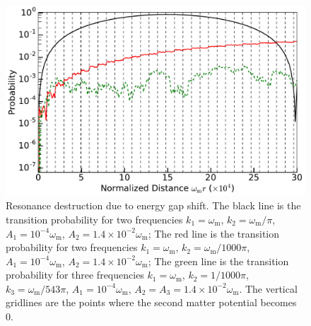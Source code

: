 \documentclass[%
reprint,
 amsmath,amssymb,
 aps,
]{revtex4-1}
\begin{document}
\begin{figure}[!htbp]
    \centering
    \includegraphics[width=\columnwidth]{assets/interference-reduction-three-modes}
    \caption{Resonance destruction due to energy gap shift. The black line is the transition probability for two frequencies $k_1=\omega_{\mathrm m}$, $k_2=\omega_{\mathrm m}/\pi$, $A_1=10^{-4}\omega_{\mathrm m}$, $A_2 = 1.4\times 10^{-2}\omega_{\mathrm m}$; The red line is the transition probability for two frequencies $k_1=\omega_{\mathrm m}$, $k_2=\omega_{\mathrm m}/1000 \pi$, $A_1=10^{-4}\omega_{\mathrm m}$, $A_2 = 1.4\times 10^{-2}\omega_{\mathrm m}$; The green line is the transition probability for three frequencies $k_1=\omega_{\mathrm m}$, $k_2=1/1000\pi$, $k_3=\omega_{\mathrm m}/543\pi$, $A_1=10^{-4}\omega_{\mathrm m}$, $A_2 =A_3 = 1.4\times10^{-2}\omega_{\mathrm m}$. The vertical gridlines are the points where the second matter potential becomes 0.}
    \label{fig-interference-reduction-three-modes}
\end{figure}



















\end{document}
